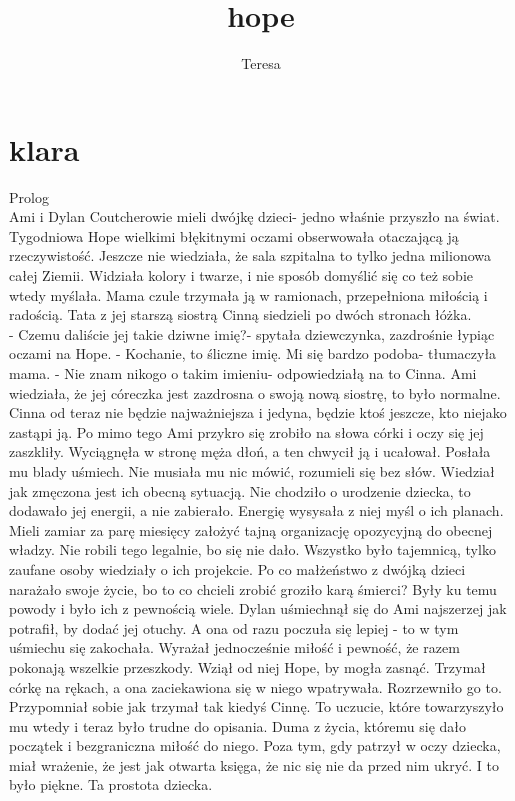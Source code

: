 \documentclass[12pt,a4paper]{book}
\author{Teresa
}
\title{hope
}
\begin{document}
\maketitle
\chapter{klara
}
              Prolog
\\Ami i Dylan Coutcherowie mieli dwójkę dzieci- jedno właśnie przyszło na świat. Tygodniowa Hope wielkimi błękitnymi oczami obserwowała otaczającą ją rzeczywistość. Jeszcze nie wiedziała, że sala szpitalna to tylko jedna milionowa całej Ziemii. Widziała kolory i twarze, i nie sposób domyślić się co też sobie wtedy myślała. Mama czule trzymała ją w ramionach, przepełniona miłością i radością. Tata z jej  starszą siostrą Cinną siedzieli po dwóch stronach łóżka. 
\\- Czemu daliście jej takie dziwne imię?- spytała dziewczynka, zazdrośnie łypiąc oczami na Hope.
- Kochanie, to śliczne imię. Mi się bardzo podoba- tłumaczyła mama.
- Nie znam nikogo o takim imieniu- odpowiedziałą na to Cinna. 
Ami wiedziała, że jej córeczka jest zazdrosna o swoją nową siostrę, to było normalne. Cinna od teraz nie będzie najważniejsza i jedyna, będzie ktoś jeszcze, kto niejako zastąpi ją. Po mimo tego Ami przykro się zrobiło na słowa córki i oczy się jej zaszkliły. Wyciągnęła w stronę męża dłoń, a ten chwycił ją i ucałował. Posłała mu blady uśmiech. Nie musiała mu nic mówić, rozumieli się bez słów. Wiedział jak zmęczona jest ich obecną sytuacją. Nie chodziło o urodzenie dziecka, to dodawało jej energii, a nie zabierało. Energię wysysała z niej myśl o ich planach. Mieli zamiar za parę miesięcy założyć tajną organizację opozycyjną do obecnej władzy. Nie robili tego legalnie, bo się nie dało. Wszystko było tajemnicą, tylko zaufane osoby wiedziały o ich projekcie. Po co małżeństwo z dwójką dzieci narażało swoje życie, bo to  co chcieli zrobić groziło karą śmierci? Były ku temu powody i było ich z pewnością wiele. 
Dylan  uśmiechnął się do Ami najszerzej jak potrafił, by dodać jej otuchy. A ona od razu poczuła się lepiej - to w tym uśmiechu się zakochała. Wyrażał jednocześnie miłość i pewność, że razem pokonają wszelkie przeszkody. 
Wziął od  niej Hope, by mogła zasnąć. Trzymał córkę na rękach, a ona zaciekawiona się w niego wpatrywała. Rozrzewniło go to. Przypomniał sobie jak trzymał tak kiedyś Cinnę. To uczucie, które towarzyszyło mu wtedy i teraz było trudne do opisania. Duma z życia, któremu się dało początek i bezgraniczna miłość do niego. Poza tym, gdy patrzył w oczy dziecka, miał wrażenie, że jest jak otwarta księga, że nic się nie da przed nim ukryć. I to było piękne. Ta prostota dziecka.
\end{document}
